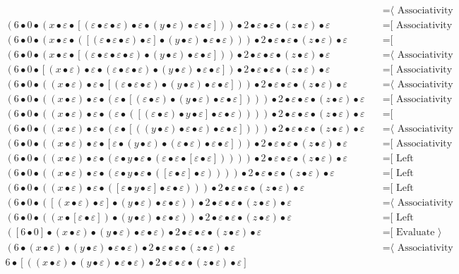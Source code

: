 \documentclass{article}
\begin{document}
\begin{align*}
  & \quad \text{=⟨ Associativity ]}\\
(6 • 0 • (x • ε • [(ε • ε • ε) • ε • (y • ε) • ε • ε])) • 2 • ε • ε • (z • ε) • ε
  & \quad \text{=[ Associativity ⟩}\\
(6 • 0 • (x • ε • ([(ε • ε • ε) • ε] • (y • ε) • ε • ε))) • 2 • ε • ε • (z • ε) • ε
  & \quad \text{=[ Commutativity ⟩}\\
(6 • 0 • (x • ε • [(ε • ε • ε • ε) • (y • ε) • ε • ε])) • 2 • ε • ε • (z • ε) • ε
  & \quad \text{=⟨ Associativity ]}\\
(6 • 0 • [(x • ε) • ε • (ε • ε • ε) • (y • ε) • ε • ε]) • 2 • ε • ε • (z • ε) • ε
  & \quad \text{=[ Associativity ⟩}\\
(6 • 0 • ((x • ε) • ε • [(ε • ε • ε) • (y • ε) • ε • ε])) • 2 • ε • ε • (z • ε) • ε
  & \quad \text{=⟨ Associativity ]}\\
(6 • 0 • ((x • ε) • ε • (ε • [(ε • ε) • (y • ε) • ε • ε]))) • 2 • ε • ε • (z • ε) • ε
  & \quad \text{=[ Associativity ⟩}\\
(6 • 0 • ((x • ε) • ε • (ε • ([(ε • ε) • y • ε] • ε • ε)))) • 2 • ε • ε • (z • ε) • ε
  & \quad \text{=[ Commutativity ⟩}\\
(6 • 0 • ((x • ε) • ε • (ε • [((y • ε) • ε • ε) • ε • ε]))) • 2 • ε • ε • (z • ε) • ε
  & \quad \text{=⟨ Associativity ]}\\
(6 • 0 • ((x • ε) • ε • [ε • (y • ε) • (ε • ε) • ε • ε])) • 2 • ε • ε • (z • ε) • ε
  & \quad \text{=[ Associativity ⟩}\\
(6 • 0 • ((x • ε) • ε • (ε • y • ε • (ε • ε • [ε • ε])))) • 2 • ε • ε • (z • ε) • ε
  & \quad \text{=[ Left neutrality ⟩}\\
(6 • 0 • ((x • ε) • ε • (ε • y • ε • ([ε • ε] • ε)))) • 2 • ε • ε • (z • ε) • ε
  & \quad \text{=[ Left neutrality ⟩}\\
(6 • 0 • ((x • ε) • ε • ([ε • y • ε] • ε • ε))) • 2 • ε • ε • (z • ε) • ε
  & \quad \text{=[ Left neutrality ⟩}\\
(6 • 0 • ([(x • ε) • ε] • (y • ε) • ε • ε)) • 2 • ε • ε • (z • ε) • ε
  & \quad \text{=⟨ Associativity ]}\\
(6 • 0 • ((x • [ε • ε]) • (y • ε) • ε • ε)) • 2 • ε • ε • (z • ε) • ε
  & \quad \text{=[ Left neutrality ⟩}\\
([6 • 0] • (x • ε) • (y • ε) • ε • ε) • 2 • ε • ε • (z • ε) • ε
  & \quad \text{=[ Evaluate ⟩}\\
(6 • (x • ε) • (y • ε) • ε • ε) • 2 • ε • ε • (z • ε) • ε
  & \quad \text{=⟨ Associativity ]}\\
6 • [((x • ε) • (y • ε) • ε • ε) • 2 • ε • ε • (z • ε) • ε]

\end{align*}
\end{document}
